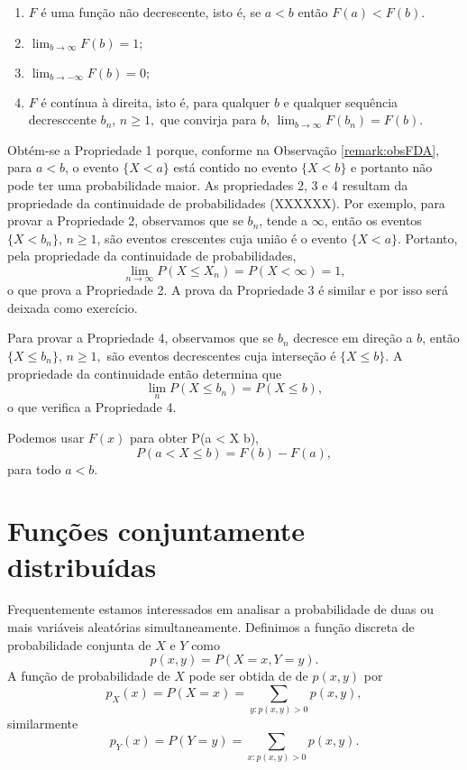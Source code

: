 \documentclass[]{book}
\providecommand{\tightlist}{%
  \setlength{\itemsep}{0pt}\setlength{\parskip}{0pt}}
\theoremstyle{definition}
\theoremstyle{definition}
\theoremstyle{definition}
\theoremstyle{remark}
\begin{document}
\begin{enumerate}
\def\labelenumi{\arabic{enumi}.}
\tightlist
\item
  \(F\) é uma função não decrescente, isto é, se \(a<b\) então \(F(a)<F(b).\)
\item
  \(\lim_{b\rightarrow \infty}F(b) = 1;\)
\item
  \(\lim_{b\rightarrow -\infty}F(b) = 0;\)
\item
  \(F\) é contínua à direita, isto é, para qualquer \(b\) e qualquer sequência decresccente \(b_n\), \(n\geq 1,\) que convirja para \(b\), \(\lim_{b\rightarrow \infty}F(b_n) = F(b).\)
\end{enumerate}

Obtém-se a Propriedade 1 porque, conforme na Observação \ref{remark:obsFDA}, para \(a<b\), o evento \(\{X<a\}\) está contido no evento \(\{X<b\}\) e portanto não pode ter uma probabilidade maior.
As propriedades 2, 3 e 4 resultam da propriedade da continuidade de probabilidades (XXXXXX).
Por exemplo, para provar a Propriedade 2, observamos que se \(b_n\), tende a \(\infty\), então os eventos \(\{X<b_n\}\), \(n \geq 1\), são eventos crescentes cuja união é o evento \(\{X<a\}\).
Portanto, pela propriedade da continuidade de probabilidades,
\[\lim_{n\rightarrow \infty}P(X\leq X_n) = P(X<\infty) = 1,\]
o que prova a Propriedade 2.
A prova da Propriedade 3 é similar e por isso será deixada como exercício.

Para provar a Propriedade 4, observamos que se \(b_n\) decresce em direção a \(b\), então \(\{X\leq b_n\}\), \(n\geq 1,\) são eventos decrescentes cuja interseção é \(\{X\leq b\}.\)
A propriedade da continuidade então determina que
\[\lim_{n}P(X\leq b_n) = P(X\leq b),\]
o que verifica a Propriedade 4.

Podemos usar \(F(x)\) para obter P(a \textless{} X \leq b),
\[P(a < X \leq b) = F(b) - F(a),\]
para todo \(a<b.\)

\hypertarget{funuxe7uxf5es-conjuntamente-distribuuxeddas}{%
\section{Funções conjuntamente distribuídas}\label{funuxe7uxf5es-conjuntamente-distribuuxeddas}}

Frequentemente estamos interessados em analisar a probabilidade de duas ou mais variáveis aleatórias simultaneamente.
Definimos a função discreta de probabilidade conjunta de \(X\) e \(Y\) como
\[p(x,y) = P(X=x, Y=y).\]
A função de probabilidade de \(X\) pode ser obtida de de \(p(x,y)\) por
\[p_X(x) = P(X=x) = \sum_{y:p(x,y)>0}p(x,y),\]
similarmente
\[p_Y(x) = P(Y=y) = \sum_{x:p(x,y)>0}p(x,y).\]
\end{document}
